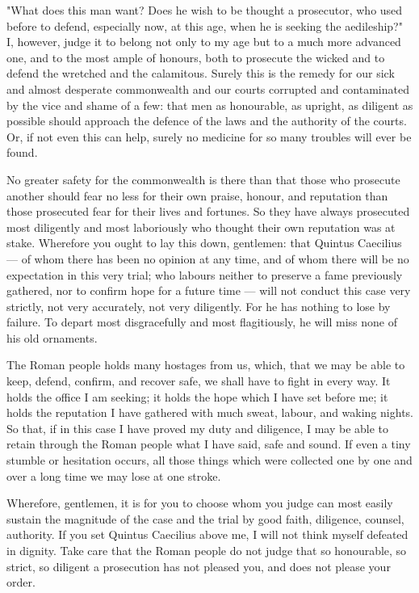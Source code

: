  "What does this man want? Does he wish to be thought a prosecutor, who used before to defend, especially now, at this age, when he is seeking the aedileship?" I, however, judge it to belong not only to my age but to a much more advanced one, and to the most ample of honours, both to prosecute the wicked and to defend the wretched and the calamitous. Surely this is the remedy for our sick and almost desperate commonwealth and our courts corrupted and contaminated by the vice and shame of a few: that men as honourable, as upright, as diligent as possible should approach the defence of the laws and the authority of the courts. Or, if not even this can help, surely no medicine for so many troubles will ever be found.

 No greater safety for the commonwealth is there than that those who prosecute another should fear no less for their own praise, honour, and reputation than those prosecuted fear for their lives and fortunes. So they have always prosecuted most diligently and most laboriously who thought their own reputation was at stake. Wherefore you ought to lay this down, gentlemen: that Quintus Caecilius --- of whom there has been no opinion at any time, and of whom there will be no expectation in this very trial; who labours neither to preserve a fame previously gathered, nor to confirm hope for a future time --- will not conduct this case very strictly, not very accurately, not very diligently. For he has nothing to lose by failure. To depart most disgracefully and most flagitiously, he will miss none of his old ornaments.

 The Roman people holds many hostages from us, which, that we may be able to keep, defend, confirm, and recover safe, we shall have to fight in every way. It holds the office I am seeking; it holds the hope which I have set before me; it holds the reputation I have gathered with much sweat, labour, and waking nights. So that, if in this case I have proved my duty and diligence, I may be able to retain through the Roman people what I have said, safe and sound. If even a tiny stumble or hesitation occurs, all those things which were collected one by one and over a long time we may lose at one stroke.

 Wherefore, gentlemen, it is for you to choose whom you judge can most easily sustain the magnitude of the case and the trial by good faith, diligence, counsel, authority. If you set Quintus Caecilius above me, I will not think myself defeated in dignity. Take care that the Roman people do not judge that so honourable, so strict, so diligent a prosecution has not pleased you, and does not please your order.

